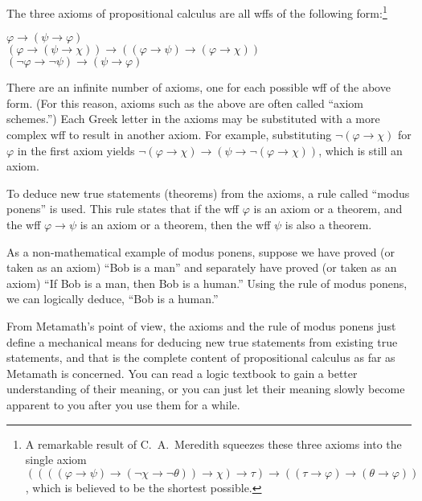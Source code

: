 The three axioms of propositional calculus are all wffs of the following form:\footnote{A remarkable result of
C.~A.~Meredith squeezes these three axioms into the
single axiom $((((\varphi\rightarrow \psi)\rightarrow(\neg \chi\rightarrow\neg
\theta))\rightarrow \chi )\rightarrow \tau)\rightarrow((\tau\rightarrow
\varphi)\rightarrow(\theta\rightarrow \varphi))$ \cite{CAMeredith},
which is believed to be the shortest possible.}
\begin{center}
     $\varphi\rightarrow(\psi\rightarrow \varphi)$\\

     $(\varphi\rightarrow (\psi\rightarrow \chi))\rightarrow
((\varphi\rightarrow  \psi)\rightarrow (\varphi\rightarrow \chi))$\\

     $(\neg \varphi\rightarrow \neg\psi)\rightarrow (\psi\rightarrow
\varphi)$
\end{center}


There are an infinite number of axioms, one for each possible
wff of the above form.  (For this reason,
axioms such as the above are often called ``axiom schemes.'')  Each Greek letter in the axioms may be substituted with a more
complex wff to result in another axiom.  For example, substituting
$\neg(\varphi\rightarrow\chi)$ for $\varphi$ in the first axiom yields
$\neg(\varphi\rightarrow\chi)\rightarrow(\psi\rightarrow
\neg(\varphi\rightarrow\chi))$, which is still an axiom.

To deduce new true statements (theorems) from the axioms, a
rule called ``modus ponens'' is used.  This
rule states that if the wff $\varphi$ is an axiom or a theorem, and the wff
$\varphi\rightarrow\psi$ is an axiom or a theorem, then the wff $\psi$ is also
a theorem.

As a non-mathematical example of modus ponens, suppose we have proved (or
taken as an axiom) ``Bob is a man'' and separately have proved (or taken as
an axiom) ``If Bob is a man, then Bob is a human.''  Using the rule of modus
ponens, we can logically deduce, ``Bob is a human.''

From Metamath's point of view, the axioms and the rule of
modus ponens just define a mechanical means for deducing new true statements
from existing true statements, and that is the complete content of
propositional calculus as far as Metamath is concerned.  You can read a logic
textbook to gain a better understanding of their meaning, or you can just let
their meaning slowly become apparent to you after you use them for a while.

